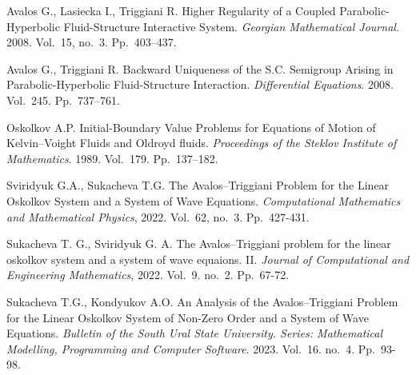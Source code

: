 \documentclass[12pt]{llncs}
\begin{document}
\begin{thebibliography}{9} %






Avalos G., Lasiecka I., Triggiani R. Higher Regularity of a Coupled Parabolic-Hyperbolic Fluid-Structure Interactive System. \textit{Georgian Mathematical Journal}. 2008.
Vol.~15, no.~3. Pp.~403--437.

Avalos G., Triggiani R. Backward Uniqueness of the S.C. Semigroup Arising
in Parabolic-Hyperbolic Fluid-Structure Interaction. \textit{Differential Equations}. 2008.
Vol.~245. Pp.~737--761.

Oskolkov A.P. Initial-Boundary Value Problems for Equations of Motion of Kelvin--Voight Fluids and Oldroyd fluids. \textit{Proceedings of the Steklov Institute of Mathematics}.
1989. Vol.~179. Pp.~137--182.

Sviridyuk G.A., Sukacheva T.G. The Avalos--Triggiani Problem for the Linear
Oskolkov System and a System of Wave Equations.  \textit{Computational Mathematics
and Mathematical Physics}, 2022. Vol.~62, no.~3. Pp.~427-431.

Sukacheva T. G.,  Sviridyuk G. A. The Avalos--Triggiani problem for the linear oskolkov system and a system of wave equaions. II. \textit{Journal of Computational and Engineering Mathematics}, 2022. Vol.~9. no.~2. Pp.~67-72.

Sukacheva T.G., Kondyukov  A.O. An Analysis of the Avalos--Triggiani Problem for the Linear Oskolkov System of Non-Zero Order and a System of Wave Equations. \textit{Bulletin of the South Ural State University. Series: Mathematical Modelling,
Programming and Computer Software}. 2023. Vol.~16. no.~4.  Pp.~93-98.

\end{thebibliography}
\end{document}
